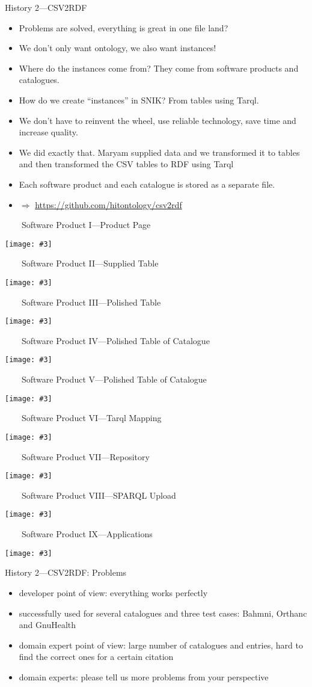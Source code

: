 \documentclass[aspectratio=1610]{beamer}
\newcommand{\imageslide}[4][]
{
\begin{frame}[plain]{~~~~#2}
\vspace{0.2em}
\begin{center}
\centering\texttt{[image: \#3]}
\end{center}
#1
\note{#4}
\end{frame}
}
\begin{document}
\begin{frame}{History 2---CSV2RDF}
\begin{itemize}
  \item Problems are solved, everything is great in one file land?
  \item We don't only want ontology, we also want instances!
  \item Where do the instances come from? They come from software products and catalogues.
  \item How do we create \enquote{instances} in SNIK? From tables using Tarql.
  \item We don't have to reinvent the wheel, use reliable technology, save time and increase quality. 
  \item We did exactly that. Maryam supplied data and we transformed it to tables and then transformed the CSV tables to RDF using Tarql
  \item Each software product and each catalogue is stored as a separate file.
  \item $\Rightarrow$ \url{https://github.com/hitontology/csv2rdf} 
\end{itemize}
\end{frame}

\imageslide{Software Product I---Product Page}{img/bahmni-example2.png}{}
\imageslide{Software Product II---Supplied Table}{img/bahmni-xslx.png}{}
\imageslide{Software Product III---Polished Table}{img/bahmni-polished.png}{}
\imageslide{Software Product IV---Polished Table of Catalogue}{img/whodhi-single.png}{}
\imageslide{Software Product V---Polished Table of Catalogue}{img/whodhi-all.png}{}
\imageslide{Software Product VI---Tarql Mapping}{img/hitocsv2rdf.png}{}
\imageslide{Software Product VII---Repository}{img/hitogithub.png}{}
\imageslide{Software Product VIII---SPARQL Upload}{img/hitosparql.png}{}
\imageslide{Software Product IX---Applications}{img/lodview.png}{}

\begin{frame}{History 2---CSV2RDF: Problems}
\begin{itemize}
  \item developer point of view: everything works perfectly
  \item successfully used for several catalogues and three test cases: Bahmni, Orthanc and GnuHealth
  \item domain expert point of view: large number of catalogues and entries, hard to find the correct ones for a certain citation
  \item domain experts: please tell us more problems from your perspective
\end{itemize}
\end{frame}
\end{document}
